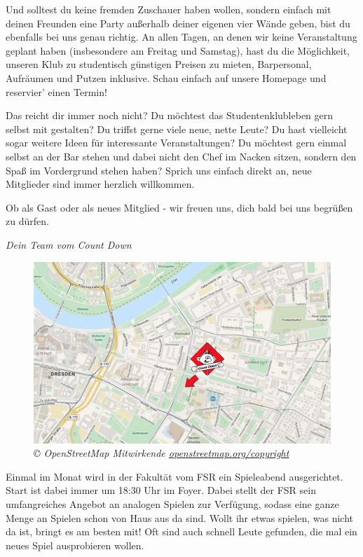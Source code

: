 Und solltest du keine fremden Zuschauer haben wollen, sondern einfach mit deinen Freunden eine Party außerhalb deiner eigenen vier Wände geben, bist du ebenfalls bei uns genau richtig.
An allen Tagen, an denen wir keine Veranstaltung geplant haben (insbesondere am Freitag und Samstag), hast du die Möglichkeit, unseren Klub zu studentisch günstigen Preisen zu mieten, Barpersonal, Aufräumen und Putzen inklusive.
Schau einfach auf unsere Homepage und reservier' einen Termin!

Das reicht dir immer noch nicht?
Du möchtest das Studentenklubleben gern selbst mit gestalten?
Du triffst gerne viele neue, nette Leute?
Du hast vielleicht sogar weitere Ideen für interessante Veranstaltungen?
Du möchtest gern einmal selbst an der Bar stehen und dabei nicht den Chef im Nacken sitzen, sondern den Spaß im Vordergrund stehen haben?
Sprich uns einfach direkt an, neue Mitglieder sind immer herzlich willkommen.

Ob als Gast oder als neues Mitglied - wir freuen uns, dich bald bei uns begrüßen zu dürfen.

\textit{Dein Team vom Count Down}

\vfill

\begin{figure}[h!]
\centering
\includegraphics[width=\linewidth]{img/lageplancd.png}
\caption*{\small \textit{© OpenStreetMap Mitwirkende \href{https://openstreetmap.org/copyright}{openstreetmap.org/copyright}}}
\end{figure}

\pagebreak


Einmal im Monat wird in der Fakultät vom FSR ein Spieleabend ausgerichtet. Start ist dabei immer um 18:30 Uhr im Foyer. Dabei stellt der FSR sein umfangreiches Angebot an analogen Spielen zur Verfügung, sodass eine ganze Menge an Spielen schon von Haus aus da sind. Wollt ihr etwas spielen, was nicht da ist, bringt es am besten mit! Oft sind auch schnell Leute gefunden, die mal ein neues Spiel ausprobieren wollen.


